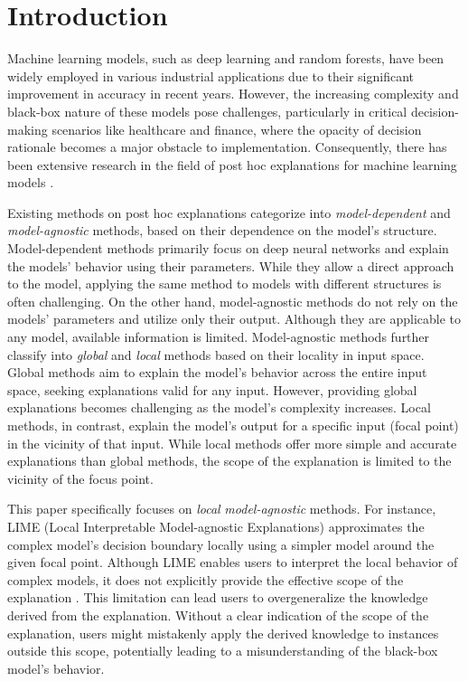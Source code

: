 \documentclass[runningheads]{llncs}
\begin{document}
\section{Introduction}
Machine learning models, such as deep learning and random forests,
have been widely employed in various industrial applications
due to their significant improvement in accuracy in recent years.
However,
the increasing complexity and black-box nature of these models pose challenges,
particularly in critical decision-making scenarios like healthcare and finance,
where the opacity of decision rationale becomes a major obstacle to
implementation.
Consequently,
there has been extensive research in the field of post hoc explanations
for machine learning models \cite{%
  ribeiro2016why,ribeiro2018anchors,radulovic2023bella,guidotti2018local}.

Existing methods on post hoc explanations categorize into
\emph{model-dependent} and \emph{model-agnostic} methods,
based on their dependence on the model's structure.
Model-dependent methods primarily focus on deep neural networks and
explain the models' behavior using their parameters.
While they allow a direct approach to the model,
applying the same method to models with different structures is often challenging.
On the other hand,
model-agnostic methods do not rely on the models' parameters and utilize only their output.
Although they are applicable to any model, available information is limited.
Model-agnostic methods further classify into
\emph{global} and \emph{local} methods based on their locality in input space.
Global methods aim to explain the model's behavior across the entire input space,
seeking explanations valid for any input.
However, providing global explanations becomes challenging as the model's complexity increases.
Local methods, in contrast, explain the model's output for a specific input
(focal point) in the vicinity of that input.
While local methods offer more simple and accurate explanations than global methods,
the scope of the explanation is limited to the vicinity of the focus point.

This paper specifically focuses on \emph{local} \emph{model-agnostic} methods.
For instance, LIME (Local Interpretable Model-agnostic Explanations)
\cite{ribeiro2016why} approximates the complex model's decision boundary
locally using a simpler model around the given focal point.
Although LIME enables users to interpret the local behavior of complex models,
it does not explicitly provide the effective scope of the explanation
\cite{ribeiro2018anchors}.
This limitation can lead users to overgeneralize the knowledge derived from the explanation.
Without a clear indication of the scope of the explanation,
users might mistakenly apply the derived knowledge to instances outside this scope,
potentially leading to a misunderstanding of the black-box model's behavior.
\end{document}
